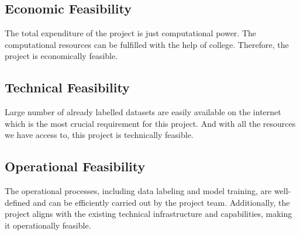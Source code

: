            \subsection{Economic Feasibility}
                The total expenditure of the project is just computational power. The computational resources can be fulfilled with the help of college. Therefore, the project is economically feasible.

            \subsection{Technical Feasibility}
                Large number of already labelled datasets are easily available on the internet which is the most crucial requirement for this project. And with all the resources we have access to, this project is technically feasible.

            \subsection{Operational Feasibility}
                The operational processes, including data labeling and model training, are well-defined and can be efficiently carried out by the project team. Additionally, the project aligns with the existing technical infrastructure and capabilities, making it operationally feasible.

            
